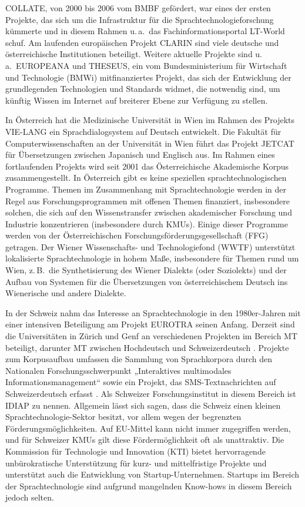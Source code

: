 \begin{multicols}{2}
COLLATE, von 2000 bis 2006 vom BMBF gefördert, war eines der ersten Projekte, das sich um die Infrastruktur für die Sprachtechnologieforschung kümmerte und in diesem Rahmen u.\,a.~das Fachinformationsportal LT-World schuf. Am laufenden europäischen Projekt CLARIN sind viele deutsche und österreichische Institutionen beteiligt. Weitere aktuelle Projekte sind u.\,a.~EUROPEANA und THESEUS, ein vom Bundesministerium für Wirtschaft und Technologie (BMWi) mitfinanziertes Projekt, das sich der Entwicklung der grundlegenden Technologien und Standards widmet, die notwendig sind, um künftig Wissen im Internet auf breiterer Ebene zur Verfügung zu stellen.

In Österreich hat die Medizinische Universität in Wien im Rahmen des Projekts VIE-LANG ein Sprachdialogsystem auf Deutsch entwickelt. Die Fakultät für Computerwissenschaften an der Universität in Wien führt das Projekt JETCAT für Übersetzungen zwischen Japanisch und Englisch aus. Im Rahmen eines fortlaufenden Projekts wird seit 2001 das Österreichische Akademische Korpus zusammengestellt. In Österreich gibt es keine speziellen sprachtechnologischen Programme. Themen im Zusammenhang mit Sprachtechnologie werden in der Regel aus Forschungsprogrammen mit offenen Themen finanziert, insbesondere solchen, die sich auf den Wissenstransfer zwischen akademischer Forschung und Industrie konzentrieren (insbesondere durch KMUs). Einige dieser Programme werden von der Österreichischen Forschungsförderungsgesellschaft (FFG) getragen. Der Wiener Wissenschafts- und Technologiefond (WWTF) unterstützt lokalisierte Sprachtechnologie in hohem Maße, insbesondere für Themen rund um Wien, z.\,B.~die Synthetisierung des Wiener Dialekts (oder Soziolekts) und der Aufbau von Systemen für die Übersetzungen von österreichischem Deutsch ins Wienerische und andere Dialekte. 

In der Schweiz nahm das Interesse an Sprachtechnologie in den 1980er-Jahren mit einer intensiven Beteiligung am Projekt EUROTRA seinen Anfang. Derzeit sind die Universitäten in Zürich und Genf an verschiedenen Projekten im Bereich MT beteiligt, darunter MT zwischen Hochdeutsch und Schweizerdeutsch  \cite{latl1}. Projekte zum Korpusaufbau umfassen die Sammlung von Sprachkorpora durch den Nationalen Forschungsschwerpunkt „Interaktives multimodales Informationsmanagement“ sowie ein Projekt, das SMS-Text\-nach\-rich\-ten auf Schweizerdeutsch erfasst \cite{sor1}. Als Schweizer Forschungsinstitut in diesem Bereich ist IDIAP zu nennen. Allgemein lässt sich sagen, dass die Schweiz einen kleinen Sprach\-tech\-no\-lo\-gie-Sek\-tor besitzt, vor allem wegen der begrenzten Förderungsmöglichkeiten. Auf EU-Mittel kann nicht immer zugegriffen werden, und für Schweizer KMUs gilt diese Fördermöglichkeit oft als unattraktiv. Die Kommission für Technologie und Innovation (KTI) bietet hervorragende unbürokratische Unterstützung für kurz- und mittelfristige Projekte und unterstützt auch die Entwicklung von Start\-up-Un\-ter\-neh\-men. Startups im Bereich der Sprachtechnologie sind aufgrund mangelnden Know-hows in diesem Bereich jedoch selten.


\end{multicols}
